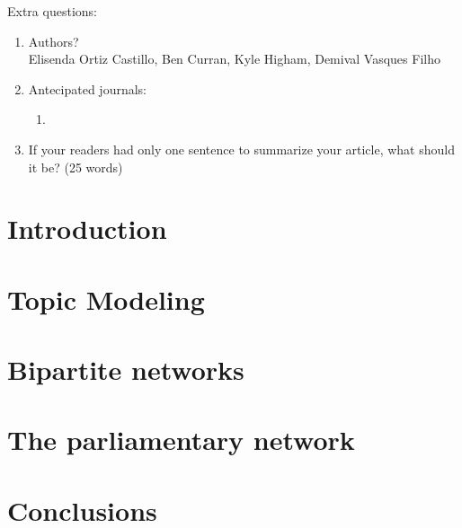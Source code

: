 \documentclass[%
reprint,
amsmath,amssymb,
aps,
]{revtex4-1}
\begin{document}
Extra questions:

\begin{enumerate}
	\item Authors? \\
	Elisenda Ortiz Castillo, Ben Curran, Kyle Higham, Demival Vasques Filho
	
	\item Antecipated journals:
	\begin{enumerate}
		
		\item
		
	\end{enumerate}
	
	\item If your readers had only one sentence to summarize your article, what should it be? (25 words) \\ 

	
\end{enumerate}
	

\section{\label{sec:introduction}Introduction}




\section{\label{sec:topic}Topic Modeling}




\section{\label{sec:bipartite}Bipartite networks}



\section{\label{sec:col_features}The parliamentary network}




\section{\label{sec:conclusions}Conclusions}




\begin{acknowledgments}

\end{acknowledgments}

%
\end{document}
